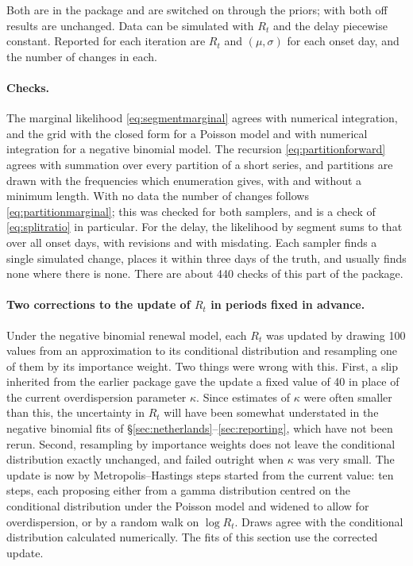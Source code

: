 \documentclass[11pt,a4paper]{article}
\begin{document}
Both are in the package and are switched on through the priors; with both off
results are unchanged. Data can be simulated with $R_t$ and the delay
piecewise constant. Reported for each iteration are $R_t$ and
$(\mu,\sigma)$ for each onset day, and the number of changes in each.

\paragraph{Checks.} The marginal likelihood \eqref{eq:segmentmarginal} agrees
with numerical integration, and the grid with the closed form for a Poisson
model and with numerical integration for a negative binomial model. The
recursion \eqref{eq:partitionforward} agrees with summation over every
partition of a short series, and partitions are drawn with the frequencies
which enumeration gives, with and without a minimum length. With no data the
number of changes follows \eqref{eq:partitionmarginal}; this was checked for
both samplers, and is a check of \eqref{eq:splitratio} in particular. For the
delay, the likelihood by segment sums to that over all onset days, with
revisions and with misdating. Each sampler finds a single simulated change,
places it within three days of the truth, and usually finds none where there
is none. There are about 440 checks of this part of the package.

\paragraph{Two corrections to the update of $R_t$ in periods fixed in
advance.} Under the negative binomial renewal model, each $R_t$ was updated by
drawing 100 values from an approximation to its conditional distribution and
resampling one of them by its importance weight. Two things were wrong with
this. First, a slip inherited from the earlier package gave the update a
fixed value of 40 in place of the current overdispersion parameter $\kappa$.
Since estimates of $\kappa$ were often smaller than this, the uncertainty in
$R_t$ will have been somewhat understated in the negative binomial fits of
\S\ref{sec:netherlands}--\ref{sec:reporting}, which have not been rerun.
Second, resampling by importance weights does not leave the conditional
distribution exactly unchanged, and failed outright when $\kappa$ was very
small. The update is now by Metropolis--Hastings steps started from the
current value: ten steps, each proposing either from a gamma distribution
centred on the conditional distribution under the Poisson model and widened
to allow for overdispersion, or by a random walk on $\log R_t$. Draws agree
with the conditional distribution calculated numerically. The fits of this
section use the corrected update.
\end{document}
